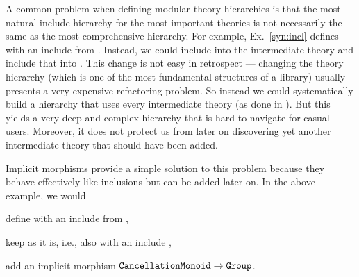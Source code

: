 A common problem when defining modular theory hierarchies is that the most natural include-hierarchy for the most important theories is not necessarily the same as the most comprehensive hierarchy.
For example, Ex.~\ref{syn:incl} defines  with an include from .
Instead, we could include  into the intermediate theory  and include that into .
This change is not easy in retrospect --- changing the theory hierarchy (which is one of the most fundamental structures of a library) usually presents a very expensive refactoring problem.
So instead we could systematically build a hierarchy that uses every intermediate theory (as done in \cite{mathscheme}).
But this yields a very deep and complex hierarchy that is hard to navigate for casual users.
Moreover, it does not protect us from later on discovering yet another intermediate theory that should have been added.

Implicit morphisms provide a simple solution to this problem because they behave effectively like inclusions but can be added later on.
In the above example, we would
\begin{compactitem}
 \item define  with an include from ,
 \item keep  as it is, i.e., also with an include ,
 \item add an implicit morphism $\operatorname{\mathtt{CancellationMonoid}}\to\operatorname{\mathtt{Group}}$.
\end{compactitem}
\medskip

